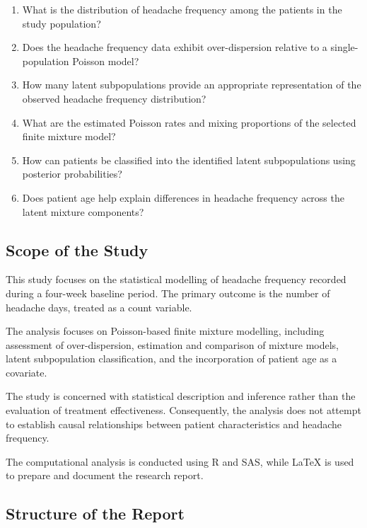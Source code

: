 \begin{enumerate}[label=\arabic*.]
    \item What is the distribution of headache frequency among the patients
    in the study population?

    \item Does the headache frequency data exhibit over-dispersion relative
    to a single-population Poisson model?

    \item How many latent subpopulations provide an appropriate
    representation of the observed headache frequency distribution?

    \item What are the estimated Poisson rates and mixing proportions of the
    selected finite mixture model?

    \item How can patients be classified into the identified latent
    subpopulations using posterior probabilities?

    \item Does patient age help explain differences in headache frequency
    across the latent mixture components?
\end{enumerate}

\subsection{Scope of the Study}

This study focuses on the statistical modelling of headache frequency
recorded during a four-week baseline period. The primary outcome is the
number of headache days, treated as a count variable.

The analysis focuses on Poisson-based finite mixture modelling, including
assessment of over-dispersion, estimation and comparison of mixture models,
latent subpopulation classification, and the incorporation of patient age as
a covariate.

The study is concerned with statistical description and inference rather than
the evaluation of treatment effectiveness. Consequently, the analysis does
not attempt to establish causal relationships between patient characteristics
and headache frequency.

The computational analysis is conducted using R and SAS, while \LaTeX{} is
used to prepare and document the research report.

\subsection{Structure of the Report}

